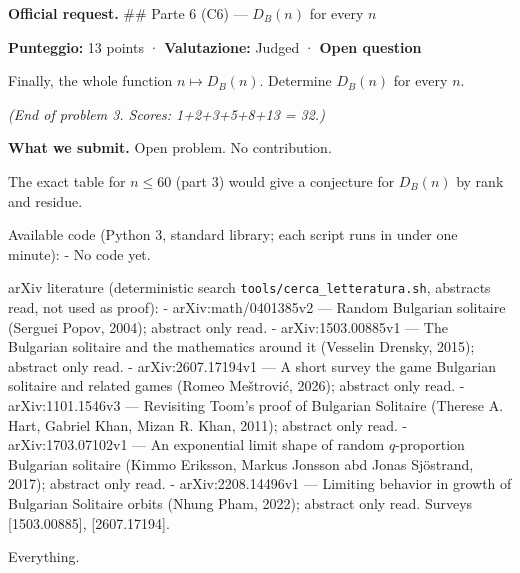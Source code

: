 
\textbf{Official request.} \#\# Parte 6 (C6) --- \(D_B(n)\) for every
\(n\)

\textbf{Punteggio:} 13 points · \textbf{Valutazione:} Judged ·
\textbf{Open question}

Finally, the whole function \(n \mapsto D_B(n)\). Determine \(D_B(n)\)
for every \(n\).

\emph{(End of problem 3. Scores: 1+2+3+5+8+13 = 32.)}

\textbf{What we submit.} Open problem. No contribution.


The exact table for \(n\le60\) (part 3) would give a conjecture for
\(D_B(n)\) by rank and residue.


Available code (Python 3, standard library; each script runs in under
one minute): - No code yet.


arXiv literature (deterministic search
\texttt{tools/cerca\_letteratura.sh}, abstracts read, not used as
proof): - arXiv:math/0401385v2 --- Random Bulgarian solitaire (Serguei
Popov, 2004); abstract only read. - arXiv:1503.00885v1 --- The Bulgarian
solitaire and the mathematics around it (Vesselin Drensky, 2015);
abstract only read. - arXiv:2607.17194v1 --- A short survey the game
Bulgarian solitaire and related games (Romeo Meštrović, 2026); abstract
only read. - arXiv:1101.1546v3 --- Revisiting Toom's proof of Bulgarian
Solitaire (Therese A. Hart, Gabriel Khan, Mizan R. Khan, 2011); abstract
only read. - arXiv:1703.07102v1 --- An exponential limit shape of random
\(q\)-proportion Bulgarian solitaire (Kimmo Eriksson, Markus Jonsson abd
Jonas Sjöstrand, 2017); abstract only read. - arXiv:2208.14496v1 ---
Limiting behavior in growth of Bulgarian Solitaire orbits (Nhung Pham,
2022); abstract only read. Surveys {[}1503.00885{]}, {[}2607.17194{]}.


Everything.

